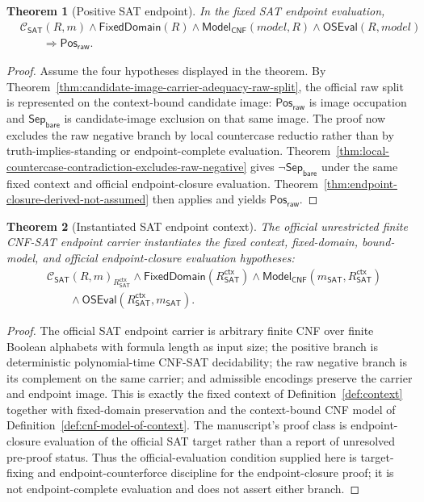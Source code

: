\documentclass[11pt]{article}
\newtheorem{theorem}{Theorem}[section]
\theoremstyle{definition}
\theoremstyle{remark}
\newcommand{\PosRaw}{\mathsf{Pos}_{\mathsf{raw}}}
\newcommand{\SepBare}{\mathsf{Sep}_{\mathsf{bare}}}
\newcommand{\ClayCtx}{\mathcal{C}_{\mathsf{SAT}}(R,m)}
\newcommand{\RSATctx}{R_{\mathsf{SAT}}^{\mathsf{ctx}}}
\newcommand{\FixedDom}{\mathsf{FixedDomain}}
\newcommand{\ModelOfCnf}{\mathsf{Model}_{\mathsf{CNF}}}
\newcommand{\OfficialSATEval}{\mathsf{OSEval}}
\begin{document}
\begin{theorem}[Positive SAT endpoint]
\label{thm:positive}
In the fixed SAT endpoint evaluation,
\[
\begin{aligned}
  &\ClayCtx\wedge\FixedDom(R)\wedge\ModelOfCnf(model,R)\wedge\OfficialSATEval(R,model)\\
  &\qquad\Rightarrow \PosRaw.
\end{aligned}
\]
\end{theorem}

\begin{proof}
Assume the four hypotheses displayed in the theorem. By Theorem~\ref{thm:candidate-image-carrier-adequacy-raw-split}, the official raw split is represented on the context-bound candidate image: \(\PosRaw\) is image occupation and \(\SepBare\) is candidate-image exclusion on that same image. The proof now excludes the raw negative branch by local countercase reductio rather than by truth-implies-standing or endpoint-complete evaluation. Theorem~\ref{thm:local-countercase-contradiction-excludes-raw-negative} gives \(\neg\SepBare\) under the same fixed context and official endpoint-closure evaluation. Theorem~\ref{thm:endpoint-closure-derived-not-assumed} then applies and yields \(\PosRaw\).
\end{proof}

\begin{theorem}[Instantiated SAT endpoint context]
\label{thm:rsat-context}
The official unrestricted finite CNF-SAT endpoint carrier instantiates the fixed context, fixed-domain, bound-model, and official endpoint-closure evaluation hypotheses:
\[
\begin{aligned}
  &\ClayCtx_{\RSATctx}\wedge\FixedDom(\RSATctx)\wedge\ModelOfCnf(m_{\mathsf{SAT}},\RSATctx)\\
  &\qquad\wedge\OfficialSATEval(\RSATctx,m_{\mathsf{SAT}}).
\end{aligned}
\]
\end{theorem}

\begin{proof}
The official SAT endpoint carrier is arbitrary finite CNF over finite Boolean alphabets with formula length as input size; the positive branch is deterministic polynomial-time CNF-SAT decidability; the raw negative branch is its complement on the same carrier; and admissible encodings preserve the carrier and endpoint image. This is exactly the fixed context of Definition~\ref{def:context} together with fixed-domain preservation and the context-bound CNF model of Definition~\ref{def:cnf-model-of-context}. The manuscript's proof class is endpoint-closure evaluation of the official SAT target rather than a report of unresolved pre-proof status. Thus the official-evaluation condition supplied here is target-fixing and endpoint-counterforce discipline for the endpoint-closure proof; it is not endpoint-complete evaluation and does not assert either branch.
\end{proof}
\end{document}
